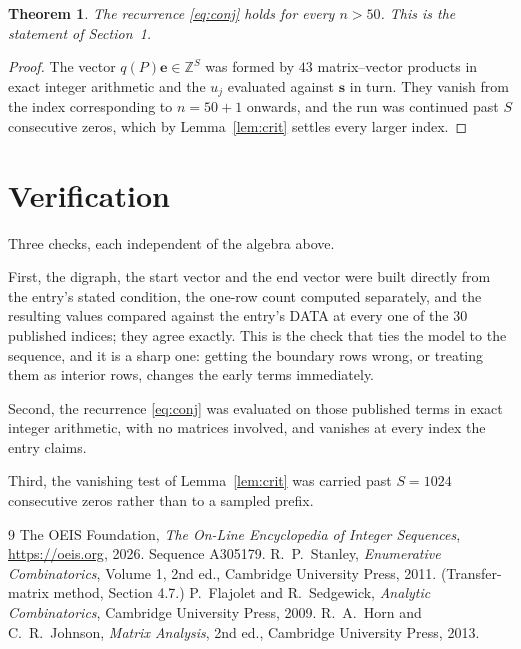 \documentclass[11pt,a4paper]{article}
\theoremstyle{plain}
\newtheorem{theorem}{Theorem}
\theoremstyle{definition}
\begin{document}
\begin{theorem}
The recurrence \eqref{eq:conj} holds for every $n>50$. This is the statement of
Section~1.
\end{theorem}

\begin{proof}
The vector $q(P)\mathbf{e}\in\mathbb{Z}^{S}$ was formed by $43$ matrix--vector
products in exact integer arithmetic and the $u_j$ evaluated against $\mathbf{s}$ in turn.
They vanish from the index corresponding to $n=50+1$ onwards, and the run was continued
past $S$ consecutive zeros, which by Lemma~\ref{lem:crit} settles every larger index.
\end{proof}

\section{Verification}

Three checks, each independent of the algebra above.

First, the digraph, the start vector and the end vector were built directly from the
entry's stated condition, the one-row count computed separately, and the resulting values
compared against the entry's DATA at every one of the $30$ published indices; they
agree exactly. This is the check that ties the model to the sequence, and it is a sharp one:
getting the boundary rows wrong, or treating them as interior rows, changes the early terms
immediately.

Second, the recurrence \eqref{eq:conj} was evaluated on those published terms in exact
integer arithmetic, with no matrices involved, and vanishes at every index the entry claims.

Third, the vanishing test of Lemma~\ref{lem:crit} was carried past $S=1024$ consecutive
zeros rather than to a sampled prefix.

\begin{thebibliography}{9}
 The OEIS Foundation, \emph{The On-Line Encyclopedia of Integer
Sequences}, \url{https://oeis.org}, 2026. Sequence A305179.
 R.~P.~Stanley, \emph{Enumerative Combinatorics}, Volume 1, 2nd ed.,
Cambridge University Press, 2011. (Transfer-matrix method, Section 4.7.)
 P.~Flajolet and R.~Sedgewick, \emph{Analytic Combinatorics}, Cambridge
University Press, 2009.
 R.~A.~Horn and C.~R.~Johnson, \emph{Matrix Analysis}, 2nd ed., Cambridge
University Press, 2013.
\end{thebibliography}
\end{document}
